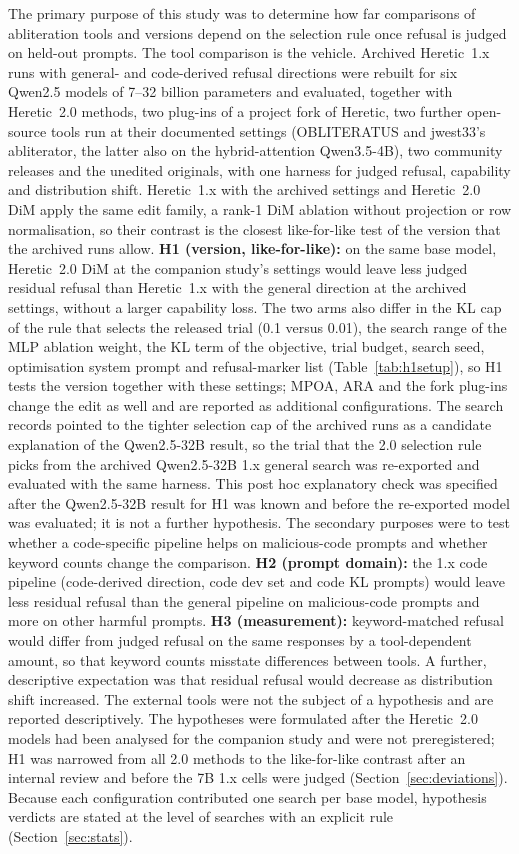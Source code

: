 The primary purpose of this study was to determine how far comparisons of abliteration tools and versions depend on
the selection rule once refusal is judged on held-out prompts. The tool comparison is the vehicle. Archived
Heretic~1.x runs with general- and code-derived refusal directions were rebuilt for six Qwen2.5 models of 7--32
billion parameters and evaluated, together with Heretic~2.0 methods, two plug-ins of a project fork of Heretic, two
further open-source tools run at their documented settings (OBLITERATUS and jwest33's abliterator, the latter also on
the hybrid-attention Qwen3.5-4B), two community releases and the unedited originals, with one harness for judged
refusal, capability and distribution shift. Heretic~1.x with the archived settings and Heretic~2.0 DiM apply the same
edit family, a rank-1 DiM ablation without projection or row normalisation, so their contrast is the closest
like-for-like test of the version that the archived runs allow. \textbf{H1 (version, like-for-like):} on the same base
model, Heretic~2.0 DiM at the companion study's settings would leave less judged residual refusal than Heretic~1.x
with the general direction at the archived settings, without a larger capability loss. The two arms also differ in
the KL cap of the rule that selects the released trial (0.1 versus 0.01), the search range of the MLP ablation weight,
the KL term of the objective, trial budget, search seed, optimisation system prompt and refusal-marker list
(Table~\ref{tab:h1setup}), so H1 tests the version together with these settings; MPOA, ARA and the fork plug-ins change
the edit as well and are reported as additional configurations. The search records pointed to the tighter selection
cap of the archived runs as a candidate explanation of the Qwen2.5-32B result, so the trial that the 2.0 selection
rule picks from the archived Qwen2.5-32B 1.x general search was re-exported and evaluated with the same harness. This
post hoc explanatory check was specified after the Qwen2.5-32B result for H1 was known and before the re-exported
model was evaluated; it is not a further hypothesis. The secondary purposes were to test whether a code-specific
pipeline helps on malicious-code prompts and whether keyword counts change the comparison. \textbf{H2 (prompt
domain):} the 1.x code pipeline (code-derived direction, code dev set and code KL prompts) would leave less residual
refusal than the general pipeline on malicious-code prompts and more on other harmful prompts. \textbf{H3
(measurement):} keyword-matched refusal would differ from judged refusal on the same responses by a tool-dependent
amount, so that keyword counts misstate differences between tools. A further, descriptive expectation was that
residual refusal would decrease as distribution shift increased. The external tools were not the subject of a
hypothesis and are reported descriptively. The hypotheses were formulated after the Heretic~2.0 models had been
analysed for the companion study and were not preregistered; H1 was narrowed from all 2.0 methods to the
like-for-like contrast after an internal review and before the 7B 1.x cells were judged
(Section~\ref{sec:deviations}). Because each configuration contributed one search per base model, hypothesis verdicts
are stated at the level of searches with an explicit rule (Section~\ref{sec:stats}).

